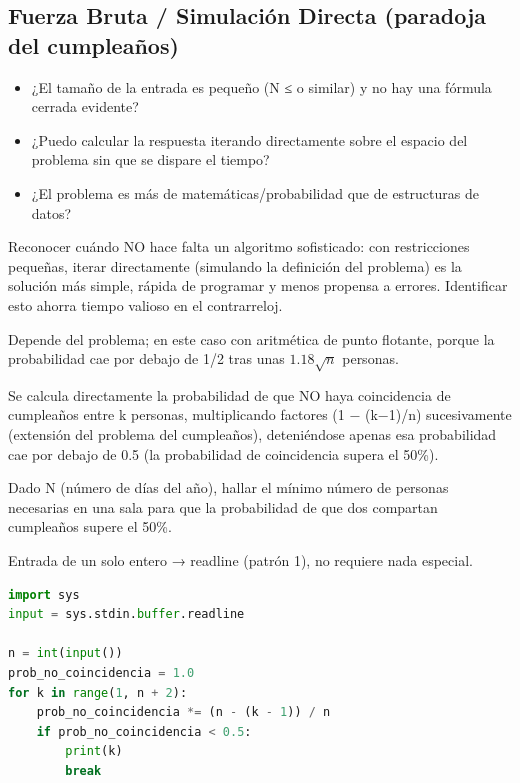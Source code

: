 \subsection{Fuerza Bruta / Simulación Directa (paradoja del cumpleaños)}
\label{alg:7-2}


\begin{itemize}
\item ¿El tamaño de la entrada es pequeño (N ≤  o similar) y no hay una fórmula cerrada evidente?
\item ¿Puedo calcular la respuesta iterando directamente sobre el espacio del problema sin que se dispare el tiempo?
\item ¿El problema es más de matemáticas/probabilidad que de estructuras de datos?
\end{itemize}

 Reconocer cuándo NO hace falta un algoritmo sofisticado: con restricciones pequeñas, iterar directamente (simulando la definición del problema) es la solución más simple, rápida de programar y menos propensa a errores. Identificar esto ahorra tiempo valioso en el contrarreloj.

 Depende del problema; en este caso  con aritmética de punto flotante, porque la probabilidad cae por debajo de 1/2 tras unas $1.18\sqrt{n}$ personas.

 Se calcula directamente la probabilidad de que NO haya coincidencia de cumpleaños entre k personas, multiplicando factores (1 − (k−1)/n) sucesivamente (extensión del problema del cumpleaños), deteniéndose apenas esa probabilidad cae por debajo de 0.5 (la probabilidad de coincidencia supera el 50\%).


Dado N (número de días del año), hallar el mínimo número de personas necesarias en una sala para que la probabilidad de que dos compartan cumpleaños supere el 50\%.

 Entrada de un solo entero → readline (patrón 1), no requiere nada especial.


\begin{lstlisting}[language=Python]
import sys
input = sys.stdin.buffer.readline
 
n = int(input())
prob_no_coincidencia = 1.0
for k in range(1, n + 2):
    prob_no_coincidencia *= (n - (k - 1)) / n
    if prob_no_coincidencia < 0.5:
        print(k)
        break
\end{lstlisting}
